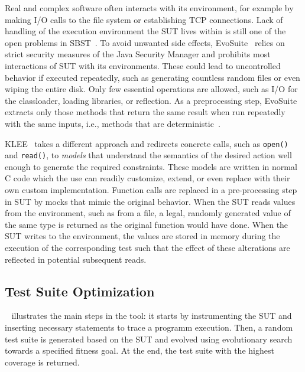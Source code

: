 \documentclass{article}
\begin{document}
Real and complex software often interacts with its environment, for example by making I/O calls to the file system or establishing TCP connections. Lack of handling of the execution environment the \ac{SUT} lives within is still one of the open problems in \ac{SBST}~\cite{McMinn2011}. To avoid unwanted side effects, EvoSuite~\cite{Fraser2013a} relies on strict security measures of the Java Security Manager and prohibits most interactions of \ac{SUT} with its environments. These could lead to uncontrolled behavior if executed repeatedly, such as generating countless random files or even wiping the entire disk. Only few essential operations are allowed, such as I/O for the classloader, loading libraries, or reflection. As a preprocessing step, EvoSuite extracts only those methods that return the same result when run repeatedly with the same inputs, i.e., methods that are deterministic~\cite{Fraser2012}.

KLEE~\cite{cadar2008klee} takes a different approach and redirects concrete calls, such as \lstinline{open()} and \lstinline{read()}, to \textit{models} that understand the semantics of the desired action well enough to generate the required constraints. These models are written in normal C code which the use can readily customize, extend, or even replace with their own custom implementation. Function calls are replaced in a pre-processing step in \ac{SUT} by mocks that mimic the original behavior. When the \ac{SUT} reads values from the environment, such as from a file, a legal, randomly generated value of the same type is returned as the original function would have done. When the \ac{SUT} writes to the environment, the values are stored in memory during the execution of the corresponding test such that the effect of these alterations are reflected in potential subsequent reads.


\subsection{Test Suite Optimization}
~ illustrates the main steps in the tool: it starts by instrumenting the \ac{SUT} and inserting necessary statements to trace a programm execution. Then, a random test suite is generated based on the \ac{SUT} and evolved using evolutionary search towards a specified fitness goal. At the end, the test suite with the highest coverage is returned.
\end{document}
